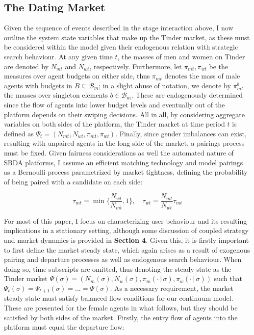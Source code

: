 \subsection{The Dating Market}
Given the sequence of events described in the stage interaction above, I now outline the system state variables that make up the Tinder market, as these must be considered within the model given their endogenous relation with strategic search behaviour. At any given time $t$, the masses of men and women on Tinder are denoted by $N_{mt}$ and $N_{wt}$, respectively. Furthermore, let $\pi_{mt}, \pi_{wt}$ be the measures over agent budgets on either side, thus $\pi_{mt}$ denotes the mass of male agents with budgets in $B \subseteq \mathcal{B}_m$; in a slight abuse of notation, we denote by $\pi_{mt}^b$ the masses over singleton elements $b\in \mathcal{B}_m$. These are endogenously determined since the flow of agents into lower budget levels and eventually out of the platform depends on their swiping decisions. All in all, by considering aggregate variables on both sides of the platform, the Tinder market at time period $t$ is defined as $\Psi_t=(N_{mt},N_{wt},\pi_{mt},\pi_{wt})$. Finally, since gender imbalances can exist, resulting with unpaired agents in the long side of the market, a pairings process must be fixed. Given fairness considerations as well the automated nature of SBDA platforms, I assume an efficient matching technology and model pairings as a Bernoulli process parametrized by market tightness, defining the probability of being paired with a candidate on each side:

$$
\tau_{mt}=\min \Big\{\frac{N_{wt}}{N_{mt}} ,1 \Big\}, \quad \tau_{wt}= \frac{N_{mt}}{N_{wt}} \tau_{mt}
$$

For most of this paper, I focus on characterizing user behaviour and its resulting implications in a stationary setting, although some discussion of coupled strategy and market dynamics is provided in \textbf{Section 4}. Given this, it is firstly important to first define the market steady state, which again arises as a result of exogenous pairing and departure processes as well as endogenous search behaviour. When doing so, time subscripts are omitted, thus denoting the steady state as the Tinder market $\Psi(\sigma)=(N_m(\sigma),N_w(\sigma),\pi_m(\cdot \,|\, \sigma),\pi_w(\cdot \,|\, \sigma))$ such that $\Psi_t(\sigma)=\Psi_{t+1}(\sigma)=...=\Psi(\sigma)$. As a necessary requirement, the market steady state must satisfy balanced flow conditions for our continuum model. These are presented for the female agents in what follows, but they should be satisfied by both sides of the market. Firstly, the entry flow of agents into the platform must equal the departure flow: 

